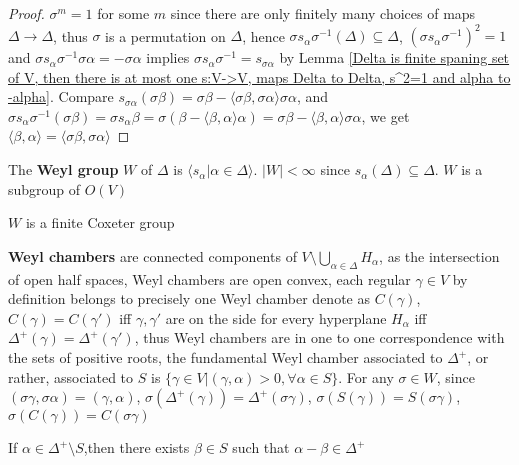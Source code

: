 \documentclass[main]{subfiles}
\begin{document}
\begin{proof}
$\sigma^m=1$ for some $m$ since there are only finitely many choices of maps $\Delta\to\Delta$, thus $\sigma$ is a permutation on $\Delta$, hence $\sigma s_\alpha\sigma^{-1}(\Delta)\subseteq\Delta$, $\left(\sigma s_\alpha\sigma^{-1}\right)^2=1$ and $\sigma s_\alpha\sigma^{-1}\sigma\alpha=-\sigma\alpha$ implies $\sigma s_\alpha\sigma^{-1}=s_{\sigma\alpha}$ by Lemma \ref{Delta is finite spaning set of V, then there is at most one s:V->V, maps Delta to Delta, s^2=1 and alpha to -alpha}. Compare $s_{\sigma\alpha}(\sigma\beta)=\sigma\beta-\langle\sigma\beta,\sigma\alpha\rangle\sigma\alpha$, and $\sigma s_\alpha\sigma^{-1}(\sigma\beta)=\sigma s_\alpha\beta=\sigma\left(\beta-\langle\beta,\alpha\rangle\alpha\right)=\sigma\beta-\langle\beta,\alpha\rangle\sigma\alpha$, we get $\langle\beta,\alpha\rangle=\langle\sigma\beta,\sigma\alpha\rangle$
\end{proof}

\begin{definition}
The \textbf{Weyl group} $W$ of $\Delta$ is $\langle s_\alpha|\alpha\in\Delta\rangle$. $|W|<\infty$ since $s_\alpha(\Delta)\subseteq\Delta$. $W$ is a subgroup of $O(V)$
\end{definition}

\begin{remark}
$W$ is a finite Coxeter group
\end{remark}

\begin{definition}
\textbf{Weyl chambers} are connected components of $\displaystyle V\setminus\bigcup_{\alpha\in\Delta}H_\alpha$, as the intersection of open half spaces, Weyl chambers are open convex, each regular $\gamma\in V$ by definition belongs to precisely one Weyl chamber denote as $C(\gamma)$, $C(\gamma)=C(\gamma')$ iff $\gamma,\gamma'$ are on the side for every hyperplane $H_\alpha$ iff $\Delta^+(\gamma)=\Delta^+(\gamma')$, thus Weyl chambers are in one to one correspondence with the sets of positive roots, the fundamental Weyl chamber associated to $\Delta^+$, or rather, associated to $S$ is $\{\gamma\in V|(\gamma,\alpha)>0,\forall \alpha\in S\}$. For any $\sigma\in W$, since $(\sigma\gamma,\sigma\alpha)=(\gamma,\alpha)$, $\sigma(\Delta^+(\gamma))=\Delta^+(\sigma\gamma)$, $\sigma(S(\gamma))=S(\sigma\gamma)$, $\sigma(C(\gamma))=C(\sigma\gamma)$
\end{definition}

\begin{lemma}\label{For any positive nonsimple root alpha, there exists simple root beta such that alpha-beta is a positive root}
If $\alpha\in\Delta^+\setminus S$,then there exists $\beta\in S$ such that $\alpha-\beta\in\Delta^+$
\end{lemma}
\end{document}
